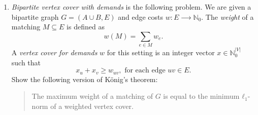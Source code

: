 \documentclass[11pt]{article}
\renewcommand{\leq}{\leqslant}
\begin{document}
\begin{enumerate}[1)]
\begin{enumerate}[a)]
    Describe the final integer programming problem that links some of the variables to the input Sudoku. 
    
  \end{enumerate}

\begin{solution}
The condition that each row must contain each number, corresponds to the set of constraints
\[
\sum_{j=1}^9 x_{i,j,k} = 1,\quad \forall\, 1 \leq i,k \leq 9.
\]
The condition that each column must contain each number, corresponds to the set of constraints
\[
\sum_{i=1}^9 x_{i,j,k} = 1,\quad \forall\, 1 \leq j,k \leq 9.
\]
The condition that each $B_{ij}$ must contain each number, corresponds to the set of constraints
\[
\sum_{\alpha=0}^2 \sum_{\beta=0}^2 x_{i+\alpha,j+\beta,k} = 1,\quad \forall\, i,j=1,4,7,\; 1\leq k\leq 9.
\]
To get the final integer program, we only need the set of constraints which guarantees that the solution is compatible with the input, i.e., 
\[
x_{i,j,k} = 1,\quad \text{if in the input of Sudoku, the cell}\; (i,j) \;\text{is assigned the number} \; k
\]
and the integrality constraints
\[
x_{i,j,k} \in \{0,1\},\quad \forall\, 1 \leq i,j,k \leq 9.
\]
\end{solution}

\item \label{e:weighted-vextex-cover}
\emph{Bipartite vertex cover with demands} is the following problem. We are given a bipartite graph $G = (A\cup B,E)$ and edge costs $w: E ⟶ ℕ_0$. The \emph{weight} of a matching  $M ⊆ E$ is defined as  
  \begin{displaymath}
   w(M) = ∑_{e∈M} w_e. 
  \end{displaymath}
  A \emph{vertex cover for demands} $w$  for this setting is an integer vector $x ∈ ℕ_0^{|V|}$ such that
    \begin{displaymath}
      x_u + x_v ≥ w_{uv}, \text{ for each edge } uv ∈ E. 
    \end{displaymath}
    Show the following version of König's theorem:
    \begin{quote}
      The maximum weight of a matching of $G$ is equal to the minimum $ℓ_1$-norm of a weighted vertex cover. 
    \end{quote}


\end{enumerate}
\end{document}
